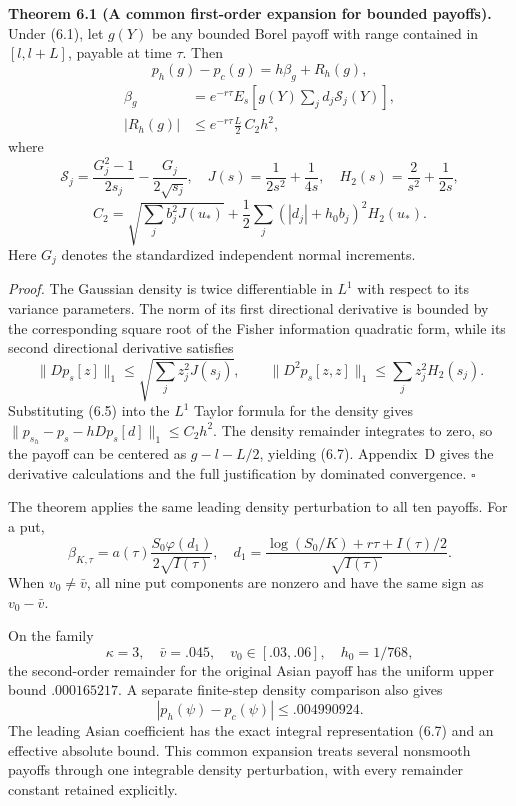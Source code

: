 \textbf{Theorem 6.1 (A common first-order expansion for bounded payoffs).}
Under (6.1), let \(g(Y)\) be any bounded Borel payoff with range contained in
\([l,l+L]\), payable at time \(\tau\). Then
\[
p_h(g)-p_c(g)=h\beta_g+R_h(g),
\tag{6.6}
\]
\[
\begin{aligned}
\beta_g&=e^{-r\tau}E_s\!\left[g(Y)\sum_jd_j\mathcal S_j(Y)\right],\\
|R_h(g)|&\le e^{-r\tau}\frac L2\,C_2h^2,
\end{aligned}
\tag{6.7}
\]
where
\[
\mathcal S_j=\frac{G_j^2-1}{2s_j}-\frac{G_j}{2\sqrt{s_j}},
\quad
J(s)=\frac1{2s^2}+\frac1{4s},\quad
H_2(s)=\frac2{s^2}+\frac1{2s},
\]
\[
C_2=
\sqrt{\sum_jb_j^2J(u_*)}
+\frac12\sum_j(|d_j|+h_0b_j)^2H_2(u_*).
\tag{6.8}
\]
Here \(G_j\) denotes the standardized independent normal increments.

\textit{Proof.}
The Gaussian density is twice differentiable in \(L^1\) with respect to its variance parameters.
The norm of its first directional derivative is bounded by the corresponding
square root of the Fisher information quadratic form, while its second directional derivative satisfies
\[
\|Dp_s[z]\|_1\le\sqrt{\sum_jz_j^2J(s_j)},\qquad
\|D^2p_s[z,z]\|_1\le\sum_jz_j^2H_2(s_j).
\]
Substituting (6.5) into the \(L^1\) Taylor formula for the density gives
\(\|p_{s_h}-p_s-hDp_s[d]\|_1\le C_2h^2\).
The density remainder integrates to zero, so the payoff can be centered as
\(g-l-L/2\), yielding (6.7).
Appendix~D gives the derivative calculations and the full justification by dominated convergence.
\hfill\(\square\)

The theorem applies the same leading density perturbation to all ten payoffs.
For a put,
\[
\beta_{K,\tau}
=a(\tau)\frac{S_0\varphi(d_1)}{2\sqrt{I(\tau)}},
\quad
d_1=\frac{\log(S_0/K)+r\tau+I(\tau)/2}{\sqrt{I(\tau)}}.
\tag{6.9}
\]
When \(v_0\ne\bar v\), all nine put components are nonzero and have the same sign as
\(v_0-\bar v\).

On the family
\[
\kappa=3,\quad\bar v=.045,\quad v_0\in[.03,.06],\quad h_0=1/768,
\tag{6.10}
\]
the second-order remainder for the original Asian payoff has the uniform upper bound
\(.000165217\). A separate finite-step density comparison also gives
\[
|p_h(\psi)-p_c(\psi)|\le .004990924.
\tag{6.11}
\]
The leading Asian coefficient has the exact integral representation (6.7) and an effective absolute bound.
This common expansion treats several nonsmooth payoffs through one integrable density perturbation,
with every remainder constant retained explicitly.

